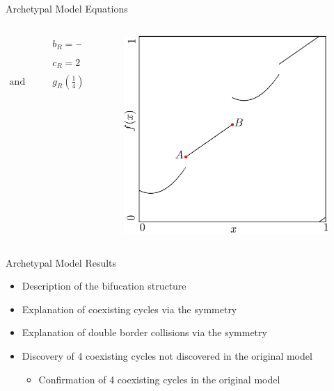 \begin{frame}{Archetypal Model Equations}
{\begin{columns}
\begin{column}{.7 \textwidth}
\begin{align*}
					 & b_R = -4 \cdot g_R\left(\tfrac{1}{4}\right) + 4 \cdot g_R\left(\tfrac{1}{2}\right),                                        \\
					 & c_R = 2 \cdot g_R\left(\tfrac{1}{4}\right) - 1 \cdot g_R\left(\tfrac{1}{2}\right),                                         \\[1em]
					\text{and} \qquad
					 & g_R\left(\tfrac{1}{4}\right) = \alpha, \text{and } g_R\left(\tfrac{1}{2}\right) = \tfrac{1}{2} + \epsilon \text{ is fixed}
				\end{align*}
			\end{column}
			\begin{column}{.3 \textwidth}
				\begin{figure}
					\centering
					\includegraphics[height=.5 \textheight]{Figs/archetypal_model_parameter_effects_illustration.png}
				\end{figure}
			\end{column}
		\end{columns}
	}
\end{frame}

\begin{frame}{Archetypal Model Results}
	\begin{itemize}
		\item Description of the bifucation structure
		\item Explanation of coexisting cycles via the symmetry
		\item Explanation of double border collisions via the symmetry
		\item Discovery of 4 coexisting cycles not discovered in the original model
		      \begin{itemize}
			      \item Confirmation of 4 coexisting cycles in the original model
		      \end{itemize}
	\end{itemize}
\end{frame}

